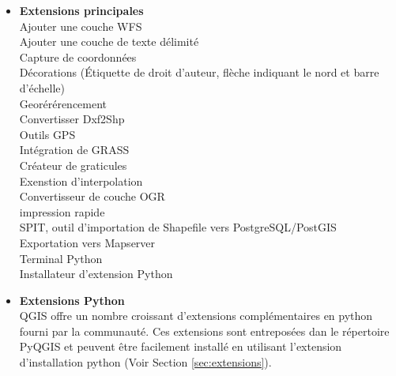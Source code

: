 \begin{itemize}
\item \textbf{Extensions principales}
\\  Ajouter une couche WFS 
\\ Ajouter une couche de texte délimité
\\ Capture de coordonnées
\\ Décorations (Étiquette de droit d'auteur, flèche indiquant le nord et barre d'échelle)
\\ Georérérencement
\\ Convertisser Dxf2Shp 
\\ Outils GPS 
\\ Intégration de GRASS
\\ Créateur de graticules
\\ Exenstion d'interpolation
\\ Convertisseur de couche OGR
\\ impression rapide
\\ SPIT, outil d'importation de Shapefile vers PostgreSQL/PostGIS
\\ Exportation vers Mapserver
\\ Terminal Python
\\ Installateur d'extension Python
\\ \item \textbf{Extensions Python}
\\ QGIS offre un nombre croissant d'extensions complémentaires en python fourni par la communauté. Ces extensions sont entreposées dan le répertoire PyQGIS et peuvent être facilement installé en utilisant l'extension d'installation python (Voir Section \ref{sec:extensions}).
\end{itemize}
